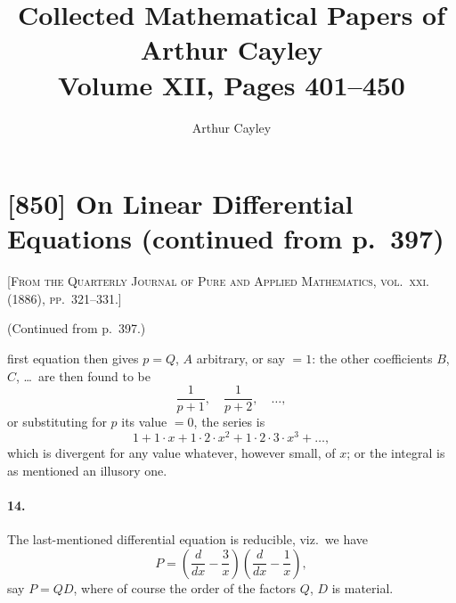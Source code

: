 \documentclass[11pt,a4paper]{article}
\title{\textbf{Collected Mathematical Papers of Arthur Cayley}\\[6pt]
\large Volume XII, Pages 401--450}
\author{Arthur Cayley}
\date{}
\theoremstyle{definition}
\begin{document}
\maketitle
\thispagestyle{empty}

\tableofcontents
\newpage

\section*{[850] On Linear Differential Equations (continued from p.~397)}

\noindent\textsc{[From the Quarterly Journal of Pure and Applied Mathematics, vol.~xxi. (1886), pp.~321--331.]}

\smallskip

\noindent (Continued from p.~397.)

\bigskip

first equation then gives $p = Q$, $A$ arbitrary, or say $=1$: the other coefficients $B$, $C$, \ldots\ are then found to be
\[
\frac{1}{p+1}, \quad \frac{1}{p+2}, \quad \ldots,
\]
or substituting for $p$ its value $=0$, the series is
\[
1 + 1\cdot x + 1\cdot 2\cdot x^{2} + 1\cdot 2\cdot 3\cdot x^{3} + \ldots,
\]
which is divergent for any value whatever, however small, of $x$; or the integral is as mentioned an illusory one.

\paragraph{14.} The last-mentioned differential equation is reducible, viz.\ we have
\[
P = \left(\frac{d}{dx} - \frac{3}{x}\right)\left(\frac{d}{dx} - \frac{1}{x}\right),
\]
say $P = QD$, where of course the order of the factors $Q$, $D$ is material.
\end{document}
